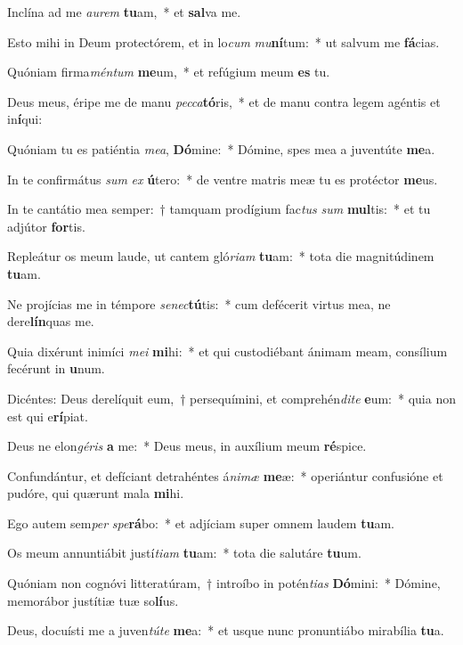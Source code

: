 \item Inclína ad me \textit{au}\textit{rem} \textbf{tu}am,~* et \textbf{sal}va me.
\item Esto mihi in Deum protectórem, et in lo\textit{cum} \textit{mu}\textbf{ní}tum:~* ut salvum me \textbf{fá}cias.
\item Quóniam firma\textit{mén}\textit{tum} \textbf{me}um,~* et refúgium meum \textbf{es} tu.
\item Deus meus, éripe me de manu \textit{pec}\textit{ca}\textbf{tó}ris,~* et de manu contra legem agéntis et in\textbf{í}qui:
\item Quóniam tu es patiéntia \textit{me}\textit{a}, \textbf{Dó}mine:~* Dómine, spes mea a juventúte \textbf{me}a.
\item In te confirmátus \textit{sum} \textit{ex} \textbf{ú}tero:~* de ventre matris meæ tu es protéctor \textbf{me}us.
\item In te cantátio mea semper:~† tamquam prodígium fac\textit{tus} \textit{sum} \textbf{mul}tis:~* et tu adjútor \textbf{for}tis.
\item Repleátur os meum laude, ut cantem gló\textit{ri}\textit{am} \textbf{tu}am:~* tota die magnitúdinem \textbf{tu}am.
\item Ne projícias me in témpore \textit{se}\textit{nec}\textbf{tú}tis:~* cum defécerit virtus mea, ne dere\textbf{lín}quas me.
\item Quia dixérunt inimíci \textit{me}\textit{i} \textbf{mi}hi:~* et qui custodiébant ánimam meam, consílium fecérunt in \textbf{u}num.
\item Dicéntes: Deus derelíquit eum,~† persequímini, et comprehén\textit{di}\textit{te} \textbf{e}um:~* quia non est qui e\textbf{rí}piat.
\item Deus ne elon\textit{gé}\textit{ris} \textbf{a} me:~* Deus meus, in auxílium meum \textbf{ré}spice.
\item Confundántur, et defíciant detrahéntes á\textit{ni}\textit{mæ} \textbf{me}æ:~* operiántur confusióne et pudóre, qui quærunt mala \textbf{mi}hi.
\item Ego autem sem\textit{per} \textit{spe}\textbf{rá}bo:~* et adjíciam super omnem laudem \textbf{tu}am.
\item Os meum annuntiábit justí\textit{ti}\textit{am} \textbf{tu}am:~* tota die salutáre \textbf{tu}um.
\item Quóniam non cognóvi litteratúram,~† introíbo in potén\textit{ti}\textit{as} \textbf{Dó}mini:~* Dómine, memorábor justítiæ tuæ so\textbf{lí}us.
\item Deus, docuísti me a juven\textit{tú}\textit{te} \textbf{me}a:~* et usque nunc pronuntiábo mirabília \textbf{tu}a.
